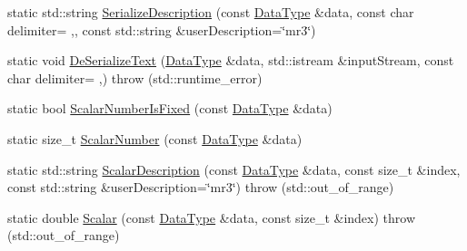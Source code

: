 \begin{DoxyCompactItemize}
static std\+::string \hyperlink{classcmn_data_3_01vct_frame4x4_3_01__element_type_00_01__row_major_01_4_01_4_af3fc5d3aa101e07a618547e950e5e456}{Serialize\+Description} (const \hyperlink{classcmn_data_3_01vct_frame4x4_3_01__element_type_00_01__row_major_01_4_01_4_abf4e17a9d0af654027bedb454326d1d2}{Data\+Type} \&data, const char delimiter= \textquotesingle{},\textquotesingle{}, const std\+::string \&user\+Description=\char`\"{}mr3\char`\"{})
\item 
static void \hyperlink{classcmn_data_3_01vct_frame4x4_3_01__element_type_00_01__row_major_01_4_01_4_af3259d2966be378b176aec926eaefe40}{De\+Serialize\+Text} (\hyperlink{classcmn_data_3_01vct_frame4x4_3_01__element_type_00_01__row_major_01_4_01_4_abf4e17a9d0af654027bedb454326d1d2}{Data\+Type} \&data, std\+::istream \&input\+Stream, const char delimiter= \textquotesingle{},\textquotesingle{})  throw (std\+::runtime\+\_\+error)
\item 
static bool \hyperlink{classcmn_data_3_01vct_frame4x4_3_01__element_type_00_01__row_major_01_4_01_4_a9c177003d2bd17cd1ece088036486c1e}{Scalar\+Number\+Is\+Fixed} (const \hyperlink{classcmn_data_3_01vct_frame4x4_3_01__element_type_00_01__row_major_01_4_01_4_abf4e17a9d0af654027bedb454326d1d2}{Data\+Type} \&data)
\item 
static size\+\_\+t \hyperlink{classcmn_data_3_01vct_frame4x4_3_01__element_type_00_01__row_major_01_4_01_4_a3e2dc20550ce45808f60337787ef8fdd}{Scalar\+Number} (const \hyperlink{classcmn_data_3_01vct_frame4x4_3_01__element_type_00_01__row_major_01_4_01_4_abf4e17a9d0af654027bedb454326d1d2}{Data\+Type} \&data)
\item 
static std\+::string \hyperlink{classcmn_data_3_01vct_frame4x4_3_01__element_type_00_01__row_major_01_4_01_4_ac86068b388a163b68483ac65f2d4ba57}{Scalar\+Description} (const \hyperlink{classcmn_data_3_01vct_frame4x4_3_01__element_type_00_01__row_major_01_4_01_4_abf4e17a9d0af654027bedb454326d1d2}{Data\+Type} \&data, const size\+\_\+t \&index, const std\+::string \&user\+Description=\char`\"{}mr3\char`\"{})  throw (std\+::out\+\_\+of\+\_\+range)
\item 
static double \hyperlink{classcmn_data_3_01vct_frame4x4_3_01__element_type_00_01__row_major_01_4_01_4_a96b42e12017e054d4997c52afb363bf7}{Scalar} (const \hyperlink{classcmn_data_3_01vct_frame4x4_3_01__element_type_00_01__row_major_01_4_01_4_abf4e17a9d0af654027bedb454326d1d2}{Data\+Type} \&data, const size\+\_\+t \&index)  throw (std\+::out\+\_\+of\+\_\+range)
\end{DoxyCompactItemize}


